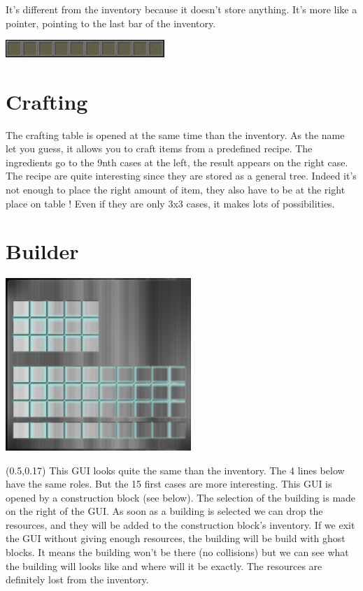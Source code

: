 \documentclass[article]{report}         %
\begin{document}
It's different from the inventory because it doesn't store anything. It's more like a pointer, pointing to the last bar of the inventory.
\begin{center}
 \includegraphics[width=6cm]{images/selectBar.png}
\end{center}
      \section{Crafting}
	The crafting table is opened at the same time than the inventory. As the name let you guess, it allows you to craft items from a predefined recipe. The ingredients go to the 9nth cases at the left, the result appears on the right case. \\
The recipe are quite interesting since they are stored as a general tree. Indeed it's not enough to place the right amount of item, they also have to be at the right place on table ! Even if they are only 3x3 cases, it makes lots of possibilities.
\newpage
	\section{Builder}
\bigskip
 \includegraphics[width=7cm]{images/Builder.png}
\begin{textblock}{0.45}(0.5,0.17)
    		This GUI looks quite the same than the inventory. The 4 lines below have the same roles. But the 15 first cases are more interesting. This GUI is opened by a construction block (see below). The selection of the building is made on the right of the GUI. As soon as a building is selected we can drop the resources, and they will be added to the construction block's inventory. If we exit the GUI without giving enough resources, the building will be build with ghost blocks. It means the building won't be there (no collisions) but we can see what the building will looks like and where will it be exactly. The resources are definitely lost from the inventory.
         \end{textblock}
\end{document}
